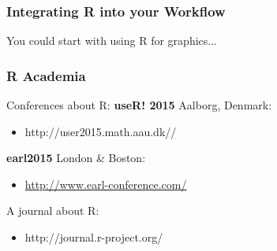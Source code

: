 \documentclass[xcolor=dvipsnames]{beamer}
\begin{document}
\begin{frame}
\frametitle{Integrating R into your Workflow}
You could start with using R for graphics...

\end{frame}



\begin{frame}
\frametitle{R Academia}
\begin{block}{Conferences about R:}
\textbf{useR! 2015} Aalborg, Denmark: \begin{itemize}
 \item http://user2015.math.aau.dk// 
 \newline
 \end{itemize}

\textbf{earl2015} London \& Boston: \begin{itemize}
\item \url{http://www.earl-conference.com/}
\newline
\end{itemize}
\end{block}

\begin{block}{A journal about R:}
\begin{itemize}
\item http://journal.r-project.org/
\end{itemize}
\end{block}
\end{frame}
\end{document}
